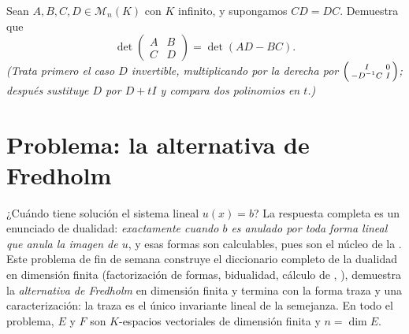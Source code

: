 \begin{exercise}[$\star\star\star$]\label{exo:b2:linalg:12}
Sean $A, B, C, D \in \mathcal{M}_n(K)$ con $K$ infinito, y supongamos
$CD = DC$. Demuestra que
\[
\det\begin{pmatrix} A & B\\ C & D\end{pmatrix}
= \det(AD - BC).
\]
\emph{(Trata primero el caso $D$ invertible, multiplicando por la
derecha por $\begin{psmallmatrix} I & 0\\ -D^{-1}C &
I\end{psmallmatrix}$; después sustituye $D$ por $D + tI$ y compara
dos polinomios en $t$.)}
\end{exercise}

\section{Problema: la alternativa de Fredholm}

¿Cuándo tiene solución el sistema lineal $u(x) = b$? La respuesta
completa es un enunciado de dualidad: \emph{exactamente cuando $b$ es
anulado por toda forma lineal que anula la imagen de $u$}, y esas
formas son calculables, pues son el núcleo de la . Este
problema de fin de semana construye el diccionario completo de la
dualidad en dimensión finita (factorización de formas, bidualidad,
cálculo de , ), demuestra la \emph{alternativa
de Fredholm} en dimensión finita y termina con la forma traza y una
caracterización: la traza es el único invariante lineal de la
semejanza. En todo el problema, $E$ y $F$ son $K$-espacios vectoriales
de dimensión finita y $n = \dim E$.

